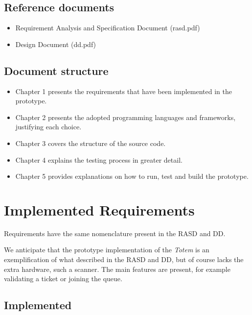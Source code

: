 \documentclass[
]{article}
\begin{document}
\hypertarget{reference-documents}{%
\subsection{Reference documents}\label{reference-documents}}

\begin{itemize}
\item
  Requirement Analysis and Specification Document (rasd.pdf)
\item
  Design Document (dd.pdf)
\end{itemize}

\hypertarget{document-structure}{%
\subsection{Document structure}\label{document-structure}}

\begin{itemize}
\item
  Chapter 1 presents the requirements that have been implemented in the
  prototype.
\item
  Chapter 2 presents the adopted programming languages and frameworks,
  justifying each choice.
\item
  Chapter 3 covers the structure of the source code.
\item
  Chapter 4 explains the testing process in greater detail.
\item
  Chapter 5 provides explanations on how to run, test and build the
  prototype.
\end{itemize}

\hypertarget{implemented-requirements}{%
\section{Implemented Requirements}\label{implemented-requirements}}

Requirements have the same nomenclature present in the RASD and DD.

We anticipate that the prototype implementation of the
\emph{Totem} is an exemplification of what described in the RASD and DD, but of course lacks the extra hardware, such a scanner.
The main features are present, for example validating a ticket or joining the queue.

\hypertarget{implemented}{%
\subsection{Implemented}\label{implemented}}
\end{document}
